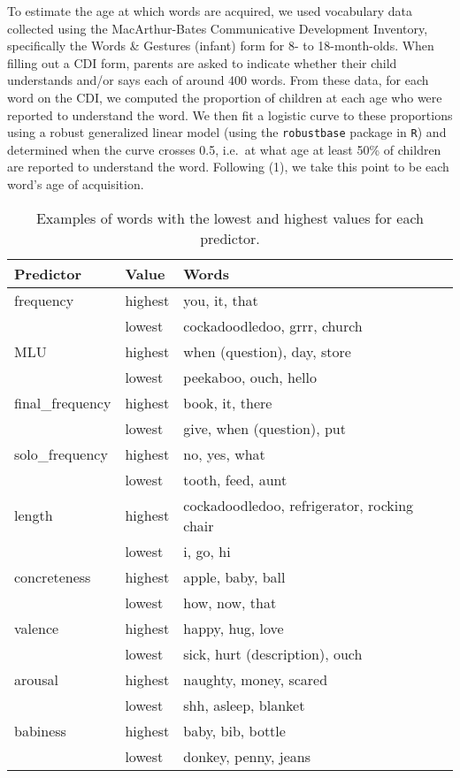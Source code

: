 \documentclass[9pt,twocolumn,twoside]{pnas-new}
\begin{document}
To estimate the age at which words are acquired, we used vocabulary data
collected using the MacArthur-Bates Communicative Development Inventory,
specifically the Words \& Gestures (infant) form for 8- to
18-month-olds. When filling out a CDI form, parents are asked to
indicate whether their child understands and/or says each of around 400
words. From these data, for each word on the CDI, we computed the
proportion of children at each age who were reported to understand the
word. We then fit a logistic curve to these proportions using a robust
generalized linear model (using the \texttt{robustbase} package in
\texttt{R}) and determined when the curve crosses 0.5, i.e.~at what age
at least 50\% of children are reported to understand the word. Following
(1), we take this point to be each word's age of acquisition.

\begin{table}[b!]
\centering
\begin{tabular}{lll}
  \hline
Predictor & Value & Words \\ 
  \hline
frequency & highest & you, it, that \\ 
   & lowest & cockadoodledoo, grrr, church \\ 
  MLU & highest & when (question), day, store \\ 
   & lowest & peekaboo, ouch, hello \\ 
  final\_frequency & highest & book, it, there \\ 
   & lowest & give, when (question), put \\ 
  solo\_frequency & highest & no, yes, what \\ 
   & lowest & tooth, feed, aunt \\ 
  length & highest & cockadoodledoo, refrigerator, rocking chair \\ 
   & lowest & i, go, hi \\ 
  concreteness & highest & apple, baby, ball \\ 
   & lowest & how, now, that \\ 
  valence & highest & happy, hug, love \\ 
   & lowest & sick, hurt (description), ouch \\ 
  arousal & highest & naughty, money, scared \\ 
   & lowest & shh, asleep, blanket \\ 
  babiness & highest & baby, bib, bottle \\ 
   & lowest & donkey, penny, jeans \\ 
   \hline
\end{tabular}
\caption{Examples of words with the lowest and highest values for each predictor.} 
\label{table:extremes}
\end{table}
\end{document}
